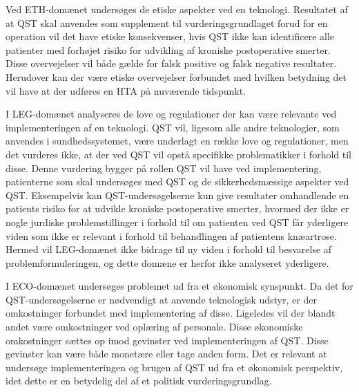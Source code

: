 Ved ETH-domænet undersøges de etiske aspekter ved en teknologi. Resultatet af at QST skal anvendes som  supplement til vurderingsgrundlaget forud for en operation vil det have etiske konsekvenser, hvis QST ikke kan identificere alle patienter med forhøjet risiko for udvikling af kroniske postoperative smerter. Disse overvejelser vil både gælde for falsk positive og falsk negative resultater. Herudover kan der være etiske overvejelser forbundet med hvilken betydning det vil have at der udføres en HTA på nuværende tidspunkt.         

I LEG-domænet analyseres de love og regulationer der kan være relevante ved implementeringen af en teknologi. QST vil, ligesom alle andre teknologier, som anvendes i sundhedssystemet, være underlagt en række love og regulationer, men det vurderes ikke, at der ved QST vil opstå specifikke problematikker i forhold til disse. Denne vurdering bygger på rollen QST vil have ved implementering, patienterne som skal undersøges med QST og de sikkerhedsmæssige aspekter ved QST. Eksempelvis kan QST-undersøgelserne kun give resultater omhandlende en patients risiko for at udvikle kroniske postoperative smerter, hvormed der ikke er nogle jurdiske problemstillinger i forhold til om patienten ved QST får yderligere viden som ikke er relevant i forhold til behandlingen af patientens knæartrose. Hermed vil LEG-domænet ikke bidrage til ny viden i forhold til besvarelse af problemformuleringen, og dette domæne er herfor ikke analyseret yderligere. 

I ECO-domænet undersøges problemet ud fra et økonomisk synspunkt. Da det for QST-undersøgelserne er nødvendigt at anvende teknologisk udstyr, er der omkostninger forbundet med implementering af disse. Ligeledes vil der blandt andet være omkostninger ved oplæring af personale. Disse økonomiske omkostninger sættes op imod gevinster ved implementeringen af QST. Disse gevinster kan være både monetære eller tage anden form. Det er relevant at undersøge implementeringen og brugen af QST ud fra et økonomisk perspektiv, idet dette er en betydelig del af et politisk vurderingsgrundlag. 

